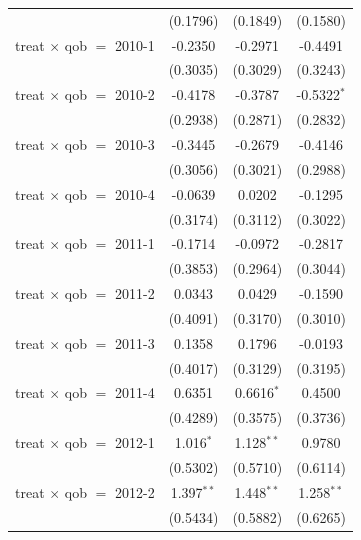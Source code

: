 \begin{table}[htbp]
\begin{tabular}{lccc}
                                     & (0.1796)      & (0.1849)       & (0.1580)\\   
      treat $\times$ qob $=$ 2010-1  & -0.2350       & -0.2971        & -0.4491\\   
                                     & (0.3035)      & (0.3029)       & (0.3243)\\   
      treat $\times$ qob $=$ 2010-2  & -0.4178       & -0.3787        & -0.5322$^{*}$\\   
                                     & (0.2938)      & (0.2871)       & (0.2832)\\   
      treat $\times$ qob $=$ 2010-3  & -0.3445       & -0.2679        & -0.4146\\   
                                     & (0.3056)      & (0.3021)       & (0.2988)\\   
      treat $\times$ qob $=$ 2010-4  & -0.0639       & 0.0202         & -0.1295\\   
                                     & (0.3174)      & (0.3112)       & (0.3022)\\   
      treat $\times$ qob $=$ 2011-1  & -0.1714       & -0.0972        & -0.2817\\   
                                     & (0.3853)      & (0.2964)       & (0.3044)\\   
      treat $\times$ qob $=$ 2011-2  & 0.0343        & 0.0429         & -0.1590\\   
                                     & (0.4091)      & (0.3170)       & (0.3010)\\   
      treat $\times$ qob $=$ 2011-3  & 0.1358        & 0.1796         & -0.0193\\   
                                     & (0.4017)      & (0.3129)       & (0.3195)\\   
      treat $\times$ qob $=$ 2011-4  & 0.6351        & 0.6616$^{*}$   & 0.4500\\   
                                     & (0.4289)      & (0.3575)       & (0.3736)\\   
      treat $\times$ qob $=$ 2012-1  & 1.016$^{*}$   & 1.128$^{**}$   & 0.9780\\   
                                     & (0.5302)      & (0.5710)       & (0.6114)\\   
      treat $\times$ qob $=$ 2012-2  & 1.397$^{**}$  & 1.448$^{**}$   & 1.258$^{**}$\\   
                                     & (0.5434)      & (0.5882)       & (0.6265)\\   

\end{tabular}
\end{table}
